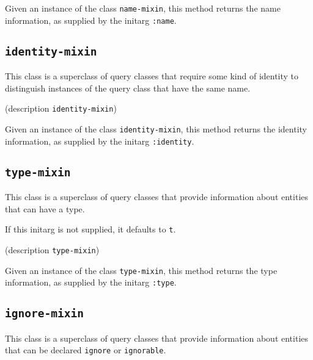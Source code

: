 Given an instance of the class \texttt{name-mixin}, this method
returns the name information, as supplied by the initarg
\texttt{:name}.

\subsection{\texttt{identity-mixin}}
\label{sec-identity-mixin}

{\footnotesize
{}
}

This class is a superclass of query classes that require some kind of
identity to distinguish instances of the query class that have the
same name.

{\footnotesize
{}
}

{\footnotesize
{} {(description {\tt identity-mixin})}
}

Given an instance of the class \texttt{identity-mixin}, this method
returns the identity information, as supplied by the initarg
\texttt{:identity}.

\subsection{\texttt{type-mixin}}
\label{sec-type-mixin}

{\footnotesize
{}
}

This class is a superclass of query classes that provide information
about entities that can have a type.

{\footnotesize
{}
}

If this initarg is not supplied, it defaults to \texttt{t}.

{\footnotesize
{} {(description {\tt type-mixin})}
}

Given an instance of the class \texttt{type-mixin}, this method
returns the type information, as supplied by the initarg
\texttt{:type}.

\subsection{\texttt{ignore-mixin}}
\label{sec-ignore-mixin}

{\footnotesize
{}
}

This class is a superclass of query classes that provide information
about entities that can be declared \texttt{ignore} or \texttt{ignorable}.

{\footnotesize
{}
}

